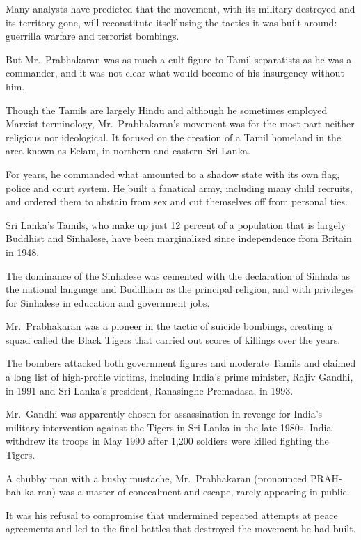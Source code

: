 \documentclass[12pt,a4paper,onecolumn]{article}
\begin{document}
Many analysts have predicted that the movement, with its military destroyed and its territory gone,
will reconstitute itself using the tactics it was built around: guerrilla warfare and terrorist
bombings.

But Mr.~Prabhakaran was as much a cult figure to Tamil separatists as he was a commander, and it was
not clear what would become of his insurgency without him.

Though the Tamils are largely Hindu and although he sometimes employed Marxist terminology,
Mr.~Prabhakaran's movement was for the most part neither religious nor ideological. It focused on
the creation of a Tamil homeland in the area known as Eelam, in northern and eastern Sri Lanka.

For years, he commanded what amounted to a shadow state with its own flag, police and court system.
He built a fanatical army, including many child recruits, and ordered them to abstain from sex and
cut themselves off from personal ties.

Sri Lanka's Tamils, who make up just 12 percent of a population that is largely Buddhist and
Sinhalese, have been marginalized since independence from Britain in 1948.

The dominance of the Sinhalese was cemented with the declaration of Sinhala as the national language
and Buddhism as the principal religion, and with privileges for Sinhalese in education and
government jobs.

Mr.~Prabhakaran was a pioneer in the tactic of suicide bombings, creating a squad called the Black
Tigers that carried out scores of killings over the years.

The bombers attacked both government figures and moderate Tamils and claimed a long list of
high-profile victims, including India's prime minister, Rajiv Gandhi, in 1991 and Sri Lanka's
president, Ranasinghe Premadasa, in 1993.

Mr.~Gandhi was apparently chosen for assassination in revenge for India's military intervention
against the Tigers in Sri Lanka in the late 1980s. India withdrew its troops in May 1990 after 1,200
soldiers were killed fighting the Tigers.

A chubby man with a bushy mustache, Mr.~Prabhakaran (pronounced PRAH-bah-ka-ran) was a master of
concealment and escape, rarely appearing in public.

It was his refusal to compromise that undermined repeated attempts at peace agreements and led to
the final battles that destroyed the movement he had built.
\end{document}
